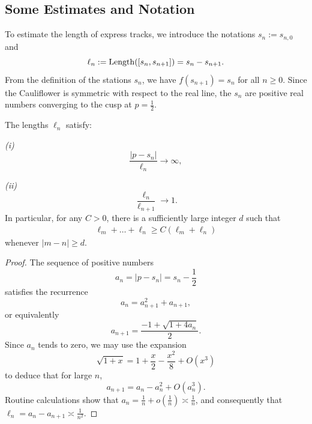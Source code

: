 \subsection{Some Estimates and Notation}

To estimate the length of express tracks, we introduce the notations $s_n := s_{n, 0}$ and 
\begin{equation}
	\ell_n := \operatorname{Length}([s_{n},s_{n+1}]) = s_{n}-s_{n+1}.
\end{equation}
From the definition of the stations $s_n$, we have $f(s_{n+1}) = s_n$ for all $n \ge 0$. Since the Cauliflower is symmetric with respect to the real line, the $s_n$ are positive real numbers converging to the cusp at $p = \frac{1}{2}$.

\begin{lemma} \label{lem-ell_n}
	The lengths ${\ell_n}$ satisfy:
	
	{\em (i)}
	\begin{equation}
	\label{eq:ell_n1}
		\frac {|p-s_n|}{\ell_n} \to \infty,
	\end{equation}
	
	{\em (ii)}
	\begin{equation}
	\label{eq:ell_n2}
		\frac{\ell_n}{\ell_{n+1}} \to 1.
	\end{equation}
	In particular, for any $C > 0$, there is a sufficiently large integer $d$ such that
	\begin{align*}
		\ell_{m}+\ldots+\ell_{n} \geq C (\ell_m+\ell_n)
	\end{align*}
	whenever $|m-n| \geq d$.
\end{lemma}

\begin{proof}
The sequence of positive numbers
$$a_n=|p-s_n|=s_n-\frac 12$$
satisfies the recurrence 
$$a_n = a_{n+1}^2+a_{n+1},$$
or equivalently 
\begin{equation}
    a_{n+1} = \frac{-1+\sqrt{1+4a_n}}2.
\end{equation}
Since $a_n$ tends to zero, we may use the expansion 
\begin{equation}
    \sqrt {1+x} = 1+\frac x2 - \frac {x^2}8 + O(x^3)
\end{equation}
to deduce that for large $n$,
\begin{equation}
    a_{n+1} = a_n - a_n^2 + O(a_n^3).
\end{equation}
Routine calculations show that $a_n = \frac 1n + o\left (\frac 1n \right ) \asymp \frac 1n$, and consequently that $\ell_n = a_n - a_{n+1} \asymp \frac 1{n^2}$.
\end{proof}

